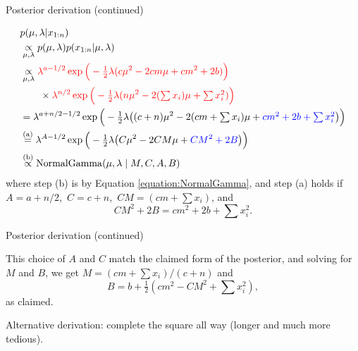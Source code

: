 \documentclass[
  ignorenonframetext,
]{beamer}
\DeclareMathOperator*{\NormalGamma}{NormalGamma}
\begin{document}
\begin{frame}{Posterior derivation (continued)}
\protect\hypertarget{posterior-derivation-continued-1}{}

\begin{small}
\begin{align*}
&p(\mu,\lambda|x_{1:n})\\ &\underset{\mu,\lambda}{\propto} p(\mu,\lambda) p(x_{1:n}|\mu,\lambda) \\
&\underset{\mu,\lambda}{\propto}
\textcolor{red}{\lambda^{a-1/2} \exp\Big(-\tfrac{1}{2}\lambda(c\mu^2 - 2 c m\mu + c m^2 + 2 b)\Big)}\\
  & \qquad\times \textcolor{red}{\lambda^{n/2} \exp\Big(-\tfrac{1}{2}\lambda(n\mu^2 - 2 (\textstyle\sum x_i) \mu + \sum x_i^2)\Big)}\\
& = \lambda^{a+n/2-1/2}
\exp\Big(-\tfrac{1}{2}\lambda\big((c+n)\mu^2 - 2 (c m +\textstyle\sum x_i) \mu + \textcolor{blue}{c m^2 + 2 b + \sum x_i^2}\big)\Big)\\
&\overset{\text{(a)}}{=}\lambda^{A-1/2}\exp\Big(-\tfrac{1}{2}\lambda\big(C\mu^2 - 2 C M \mu + \textcolor{blue}{C M^2 + 2 B}\big)\Big)\\
&\overset{\text{(b)}}{\propto} \NormalGamma(\mu,\lambda\mid M,C,A,B)
\end{align*}
where step (b) is by Equation \ref{equation:NormalGamma},
and step (a) holds if $A=a+n/2$, $\,C=c+n$, $\,C M = (c m + \textstyle\sum x_i)$, and
$$C M^2 + 2 B = c m^2 + 2 b + \sum x_i^2.$$
\end{small}

\end{frame}

\begin{frame}{Posterior derivation (continued)}
\protect\hypertarget{posterior-derivation-continued-2}{}

This choice of \(A\) and \(C\) match the claimed form of the posterior,
and solving for \(M\) and \(B\), we get \(M = (c m + \sum x_i)/(c+n)\)
and \[ B = b +\tfrac{1}{2}(c m^2-C M^2+\textstyle\sum x_i^2), \] as
claimed.

Alternative derivation: complete the square all way (longer and much
more tedious).

\end{frame}
\end{document}
